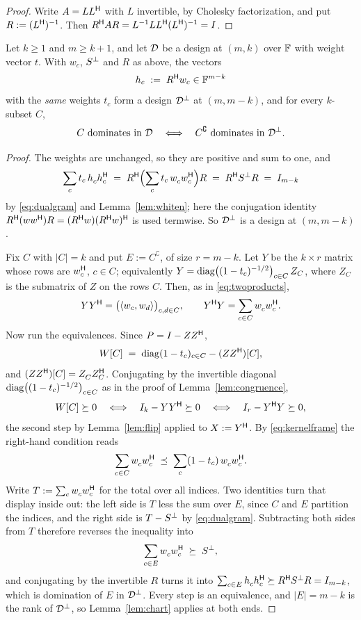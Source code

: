 \begin{proof}
Write $A=LL^{\mathsf{H}}$ with $L$ invertible, by Cholesky factorization, and put
$R:=(L^{\mathsf{H}})^{-1}$.  Then $R^{\mathsf{H}} AR=L^{-1}LL^{\mathsf{H}}(L^{\mathsf{H}})^{-1}=I$.
\end{proof}

\begin{theorem}[Lean]\label{thm:duality}
Let $k\ge1$ and $m\ge k+1$, and let $\mathcal{D}$ be a design at $(m,k)$
over $\mathbb{F}$ with weight vector $t$.  With $w_c$, $S^{\perp}$ and $R$ as above, the
vectors
\[
  h_c\;:=\;R^{\mathsf{H}} w_c\in\mathbb{F}^{m-k}
\]
with the \emph{same} weights $t_c$ form a design $\mathcal{D}^{\perp}$ at
$(m,m-k)$, and for every $k$-subset $C$,
\[
  C\ \text{dominates in}\ \mathcal{D}
  \quad\Longleftrightarrow\quad
  C^{\complement}\ \text{dominates in}\ \mathcal{D}^{\perp} .
\]
\end{theorem}

\begin{proof}
The weights are unchanged, so they are positive and sum to one, and
\[
  \sum_c t_c\,h_c^{\vphantom{\mathsf{H}}}h_c\adj
  \;=\;R\adj\Bigl(\sum_ct_c\,w_c^{\vphantom{\mathsf{H}}}w_c\adj\Bigr)R
  \;=\;R\adj\Sdual R\;=\;I_{m-k}
\]
by \eqref{eq:dualgram} and Lemma~\ref{lem:whiten}; here the conjugation
identity $R^{\mathsf{H}}(ww^{\mathsf{H}})R=(R^{\mathsf{H}} w)(R^{\mathsf{H}} w)^{\mathsf{H}}$ is used termwise.  So
$\mathcal{D}^{\perp}$ is a design at $(m,m-k)$.

Fix $C$ with $\lvert C\rvert=k$ and put $E:=C^{\complement}$, of size
$r=m-k$.  Let $Y$ be the $k\times r$ matrix whose rows are $w_c^{\mathsf{H}}$,
$c\in C$; equivalently
$Y=\operatorname{diag}\bigl((1-t_c)^{-1/2}\bigr)_{c\in C}\,Z_C$, where $Z_C$ is the
submatrix of $Z$ on the rows $C$.  Then, as in \eqref{eq:twoproducts},
\[
  Y^{\vphantom{\mathsf{H}}}Y\adj=\bigl(\langle w_c,w_d\rangle\bigr)_{c,d\in C},
  \qquad
  Y\adj Y^{\vphantom{\mathsf{H}}}=\sum_{c\in C}w_c^{\vphantom{\mathsf{H}}}w_c\adj .
\]
Now run the equivalences.  Since $P=I-ZZ^{\mathsf{H}}$,
\[
  W[C]\;=\;\operatorname{diag}(1-t_c)_{c\in C}-(ZZ^{\mathsf{H}})[C],
\]
and $(ZZ\adj)[C]=Z_C^{\vphantom{\mathsf{H}}}Z_C\adj$.  Conjugating by the
invertible diagonal $\operatorname{diag}\bigl((1-t_c)^{-1/2}\bigr)_{c\in C}$ as in the
proof of Lemma~\ref{lem:congruence},
\[
  W[C]\psd0
  \quad\Longleftrightarrow\quad
  I_k-Y^{\vphantom{\mathsf{H}}}Y\adj\psd0
  \quad\Longleftrightarrow\quad
  I_r-Y\adj Y^{\vphantom{\mathsf{H}}}\psd0 ,
\]
the second step by Lemma~\ref{lem:flip} applied to $X:=Y^{\mathsf{H}}$.  By
\eqref{eq:kernelframe} the right-hand condition reads
\[
  \sum_{c\in C}w_c^{\vphantom{\mathsf{H}}}w_c\adj
  \;\preceq\;\sum_{c}(1-t_c)\,w_c^{\vphantom{\mathsf{H}}}w_c\adj .
\]
Write $T:=\sum_c w_c^{\vphantom{\mathsf{H}}}w_c\adj$ for the total over all
indices.  Two identities turn that display inside out: the left side is
$T$ less the sum over $E$, since $C$ and $E$ partition the indices, and
the right side is $T-S^{\perp}$ by \eqref{eq:dualgram}.  Subtracting both
sides from $T$ therefore reverses the inequality into
\[
  \sum_{c\in E}w_c^{\vphantom{\mathsf{H}}}w_c\adj\;\psd\;\Sdual ,
\]
and conjugating by the invertible $R$ turns it into
$\sum_{c\in E}h_c^{\vphantom{\mathsf{H}}}h_c\adj\psd R\adj\Sdual R=I_{m-k}$, which is
domination of $E$ in $\mathcal{D}^{\perp}$.  Every step is an
equivalence, and $\lvert E\rvert=m-k$ is the rank of $\mathcal{D}^{\perp}$,
so Lemma~\ref{lem:chart} applies at both ends.
\end{proof}

